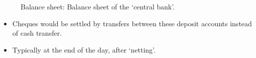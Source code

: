 \documentclass[20pt]{article}
\begin{document}
\begin{center}
\begin{figure}[H]
\begin{center}
\begin{tikzpicture}[auto, node distance=3cm,scale=(2/10),>=latex']




\end{tikzpicture}
\end{center}
\caption{Balance sheet: Balance sheet of the `central bank'.}
\end{figure}
\end{center}
\begin{itemize}
    \item Cheques would be settled by transfers between these deposit accounts instead of cash transfer.
    \item Typically at the end of the day, after `netting'.
\end{itemize}


\end{document}
